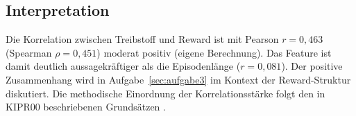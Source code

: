 \subsection{Interpretation}

Die Korrelation zwischen Treibstoff und Reward ist mit Pearson $r = 0{,}463$ (Spearman $\rho = 0{,}451$) moderat positiv (eigene Berechnung). Das Feature ist damit deutlich aussagekräftiger als die Episodenlänge ($r = 0{,}081$). Der positive Zusammenhang wird in Aufgabe~\ref{sec:aufgabe3} im Kontext der Reward-Struktur diskutiert. Die methodische Einordnung der Korrelationsstärke folgt den in KIPR00 beschriebenen Grundsätzen \cite[S.~22--23]{2}.

